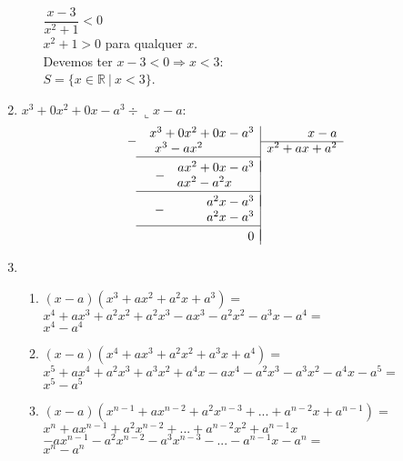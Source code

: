 \begin{enumerate}
\begin{enumerate}
			$\dfrac{x - 3}{x^2 + 1} < 0$\\
			$x^2 + 1 > 0$ para qualquer $x$.\\
			Devemos ter $x - 3 < 0 \Rightarrow x < 3$:\\
			$S =  \lbrace x \in \mathbb{R} \ |\ x < 3 \rbrace$.
		\end{enumerate}
		\item %
			$x^3 + 0x^2 + 0x - a^3 \div \llcorner x - a$:
			\\
			\[
  \begin{array}{r|r}
    \dropsign{-} x^3 + 0x^2 + 0x - a^3 & x - a \\ \cline{2-2}
    x^3 - ax^2 \phantom{ + 0x - a^3}& x^2 + ax + a^2 \\ \cline{1-1} \\[\dimexpr-\normalbaselineskip+\jot]
    \dropsign{-}ax^2 + 0x - a^3 \\
           \phantom{0x^3 + } ax^2 - a^2x \phantom{+ a^3} \\ \cline{1-1} \\[\dimexpr-\normalbaselineskip+\jot]
    \dropsign{-}\phantom{ax^2 + }a^2x - a^3 \\
           \phantom{0x^3 + ax^2 + } a^2x - a^3 \\ \cline{1-1} \\[\dimexpr-\normalbaselineskip+\jot]
                      0
  \end{array}
\]
		\item %
		\begin{enumerate}
			\addtocounter{enumii}{2}
			\item %
				$(x - a)(x^3 + ax^2 +a^2x + a^3) = $\\
				$x^4 + ax^3 + a^2x^2 + a^2x^3 - ax^3 - a^2x^2 - a^3x - a^4 = $\\
				$x^4 - a^4$
				
			\item %
				$(x - a)(x^4 + ax^3 +a^2x^2 + a^3x + a^4) = $\\
				$x^5 + ax^4 + a^2x^3 + a^3x^2 + a^4x - ax^4 - a^2x^3 - a^3x^2 - a^4x - a^5 = $\\
				$x^5 - a^5$
				
			\item %
			$(x - a)(x^{n-1} + ax^{n-2} +a^2x^{n-3} + ... + a^{n-2}x + a^{n-1}) = $\\
			$x^{n} + ax^{n-1} +a^2x^{n-2} + ... + a^{n-2}x^2 + a^{n-1}x$ \\ 
			$- ax^{n-1} - a^2x^{n-2} -a^3x^{n-3} - ... - a^{n-1}x - a^{n} =$\\
			$x^{n} - a^{n}$\\
			

\end{enumerate}
\end{enumerate}
